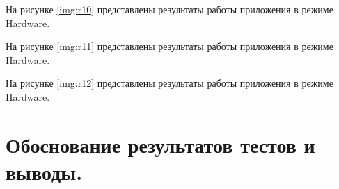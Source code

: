 \newpage

На рисунке \ref{img:r10} представлены результаты работы приложения в режиме Hardware.

\newpage

На рисунке \ref{img:r11} представлены результаты работы приложения в режиме Hardware.

\newpage

На рисунке \ref{img:r12} представлены результаты работы приложения в режиме Hardware.

\newpage

\chapter*{Обоснование результатов тестов и выводы.}

